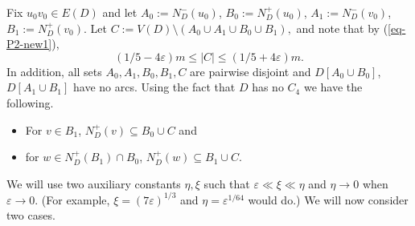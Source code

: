 \documentclass{article}
\renewcommand{\epsilon}{{\varepsilon}}
\begin{document}
Fix ${u_0v_0} \in E(D)$ and let $A_0:=N^-_D(u_0)$, $B_0:=N^+_D(u_0)$, $A_1:=N^-_D(v_0)$, $B_1:=N^+_D(v_0).$ Let $C:=V(D)\setminus (A_0\cup A_1\cup B_0\cup B_1),$ and note that by (\ref{eq-P2-new1}),
\begin{equation}\label{eq0}
(1/5-4\epsilon)m\leq |C|\leq (1/5+4\epsilon)m.
\end{equation}
In addition, all sets $A_0, A_1, B_0, B_1, C$ are pairwise disjoint and $D[A_0\cup B_0]$, $D[A_1\cup B_1]$ have no arcs. Using the fact that $D$ has no $C_4$ we have the following. 
\begin{itemize}
    \item[(a)] For $v\in B_1$, $N^+_D(v)\subseteq B_0\cup C$ and
    \item[(b)] for $w\in N^+_D(B_1)\cap B_0$, $N^+_D(w)\subseteq B_1\cup C$.
\end{itemize}
We will use two auxiliary constants $\eta, \xi$  such that $\epsilon\ll \xi\ll \eta$ and $\eta\rightarrow 0$ when $\epsilon\rightarrow 0$. (For example, $\xi=(7\epsilon)^{1/3}$ and $\eta=\epsilon^{1/64}$ would do.)  
We will now consider two cases.\\
\end{document}
